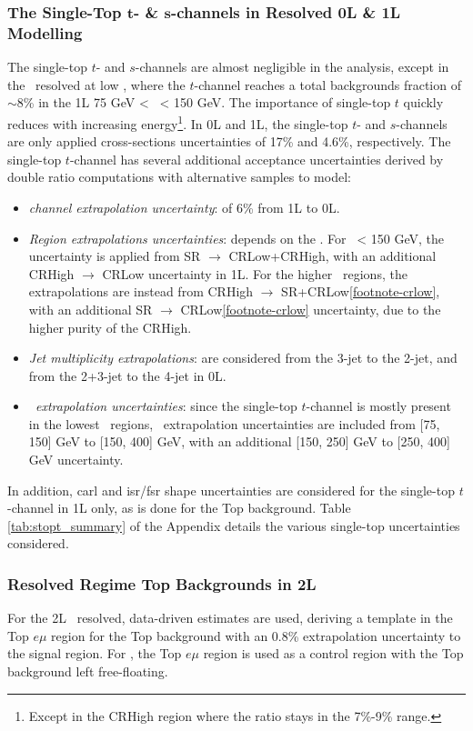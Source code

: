\subsubsection{The Single-Top $\boldsymbol{t}$- \& $\boldsymbol{s}$-channels in Resolved 0L \& 1L Modelling}
The single-top $t$- and $s$-channels are almost negligible in the analysis, except in the \vhb\ resolved at low \ptv, where the $t$-channel reaches a total backgrounds fraction of $\sim$8\% in the 1L 75 GeV < \ptv\ < 150 GeV. The importance of single-top $t$ quickly reduces with increasing energy\footnote{Except in the CRHigh region where the ratio stays in the 7\%-9\% range.}. In 0L and 1L, the single-top $t$- and $s$-channels are only applied cross-sections uncertainties of 17\% and 4.6\%, respectively. The single-top $t$-channel has several additional acceptance uncertainties derived by double ratio computations with alternative samples to model: 
\begin{itemize}
    \item \textit{channel extrapolation uncertainty}: of 6\% from 1L to 0L.
    \item \textit{Region extrapolations uncertainties}: depends on the \ptv. For \ptv\ < 150 GeV, the uncertainty is applied from SR $\rightarrow$ CRLow+CRHigh, with an additional CRHigh $\rightarrow$ CRLow uncertainty in 1L. For the higher \ptv\ regions, the extrapolations are instead from CRHigh $\rightarrow$ SR+CRLow\cref{footnote-crlow}, with an additional SR $\rightarrow$ CRLow\cref{footnote-crlow} uncertainty, due to the higher purity of the CRHigh.
    \item \textit{Jet multiplicity extrapolations}: are considered from the 3-jet to the 2-jet, and from the 2+3-jet to the 4-jet in 0L.
    \item \textit{\ptv\ extrapolation uncertainties}: since the single-top $t$-channel is mostly present in the lowest \ptv\ regions, \ptv\ extrapolation uncertainties are included from [75, 150] GeV to [150, 400] GeV, with an additional [150, 250] GeV to [250, 400] GeV uncertainty.
\end{itemize}
In addition, \gls{carl} and \gls{isr}/\gls{fsr} shape uncertainties are considered for the single-top $t$-channel in 1L only, as is done for the Top background. Table \ref{tab:stopt_summary} of the Appendix details the various single-top uncertainties considered.

\subsubsection{Resolved Regime Top Backgrounds in 2L} 
For the 2L \vhb\ resolved, data-driven estimates are used, deriving a template in the Top $e\mu$ region for the Top background with an 0.8\% extrapolation uncertainty to the signal region. For \vhc, the Top $e\mu$ region is used as a control region with the Top background left free-floating.


